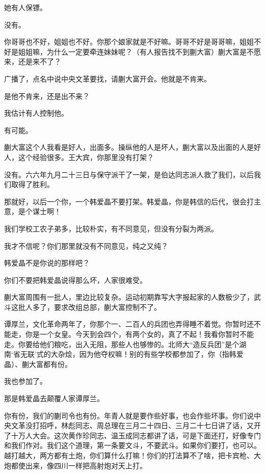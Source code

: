 她有人保镖。

没有。

你哥哥也不好，姐姐也不好。你那个娘家就是不好嘛。哥哥不好是哥哥嘛，姐姐不好是姐姐嘛，为什么一定要牵连妹妹呢？（有人报告找不到蒯大富）蒯大富是不愿来，还是来不了？

广播了，点名中说中央文革要找，请蒯大富开会。他就是不肯来。

是他不肯来，还是出不来？

我估计有人控制他。

有可能。

蒯大富这个人我看是好人，出面多。操纵他的人是坏人，蒯大富以及出面的人是好人，这个经验很多。王大宾，你那里没有打架？

没有。六六年九月二十三日与保守派干了一架，是伯达同志派人救了我们，以后我们取得了胜利。

那就好，以后一个你，一个韩爱晶不要打架。韩爱晶，你是韩信的后代，很会打主意，是个谋士啊！

我们学校工农子弟多，比较朴实，有不同意见，但没有分裂为两派。

我才不信呢？你们那里就没有不同意见，纯之又纯？

韩爱晶不是你说的那样吧？

你们不要把韩爱晶说得那么坏，人家很难受。

蒯大富周围有一批人，里边比较复杂。运动初期靠写大字报起家的人数极少了，武斗这批人多了，要求改组总部，蒯大富控制不了。

谭厚兰，文化革命两年了，你那个一、二百人的兵团也弄得睡不着觉。你暂时还不能走，你是一个女皇。今天到会四个，有两个女的，真了不起！我看你暂时不能走。你要给他们粮吃，出入无阻，那些人也够惨的。北师大“造反兵团”是个湖南‘省无联’式的大杂烩，因为他夺权嘛！别的有些学校都参加了，你（指韩爱晶）、蒯大富都有份。

我也参加了。

那是韩爱晶去颠覆人家谭厚兰。

你有份，我们的蒯司令也有份。年青人就是要作些好事，也会作些坏事。你们说中央文革没打招呼，林彪同志、周总理在三月二十四日、三月二十七日讲了话，又开了十万人大会。这次黄作珍同志、温玉成同志都讲了话，可是下面还打，好像专门和我们作对。我们这个道理，第一条要文斗，不要武斗。如果你们要打，也可以。越打越大，两方都有土炮，你们算什么打嘛！你们的打法算不了啥，把卡宾枪、大炮都使出来，像四川一样把高射炮对天上打。

